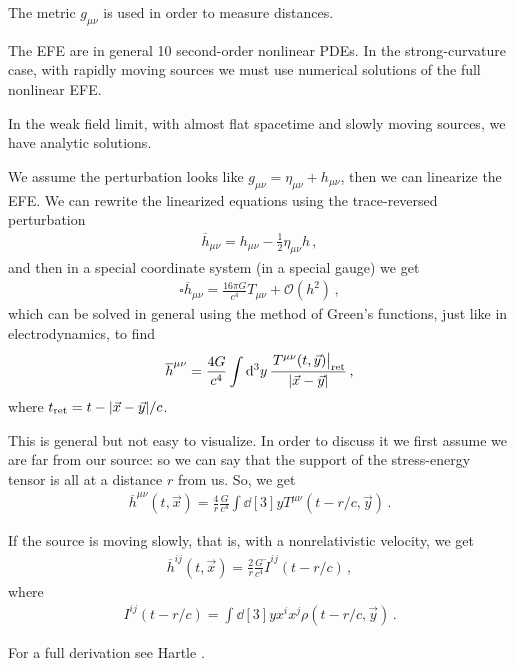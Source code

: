 \documentclass[main.tex]{subfiles}
\begin{document}
The metric \(g_{\mu \nu }\) is used in order to measure distances. 

The EFE are in general 10 second-order nonlinear PDEs. 
In the strong-curvature case, with rapidly moving sources we must use numerical solutions of the full nonlinear EFE. 

In the weak field limit, with almost flat spacetime and slowly moving sources, we have analytic solutions. 

We assume the perturbation looks like \(g_{\mu \nu } = \eta_{\mu \nu } + h_{\mu \nu } \), then we can linearize the EFE. We can rewrite the linearized equations using the trace-reversed perturbation 
%
\begin{align}
\overline{h}_{\mu \nu } = h_{\mu \nu } - \frac{1}{2} \eta_{\mu \nu } h
\,,
\end{align}
%
and then in a special coordinate system (in a special gauge) we get 
%
\begin{align}
\square \overline{h}_{\mu \nu } = \frac{16 \pi G}{c^{4}} T_{\mu \nu } + \mathcal{O}(h^2)
\,,
\end{align}
%
which can be solved in general using the method of Green's functions, just like in electrodynamics, to find 
%
\begin{align}
\overline{h}^{\mu \nu } = \frac{4G}{c^{4}} \int \dd[3]{y} \frac{\eval{T^{\mu \nu} (t, \vec{y})}_{\text{ret}}}{\abs{\vec{x}- \vec{y}}}
\,,
\end{align}
%
where \(t _{\text{ret}} = t - \abs{\vec{x} - \vec{y}}/c\). 

This is general but not easy to visualize. In order to discuss it we first assume we are far from our source:
so we can say that the support of the stress-energy tensor is all at a distance \(r\) from us. So, we get 
%
\begin{align}
\overline{h}^{\mu \nu } (t, \vec{x}) = \frac{4}{r} \frac{G}{c^{4}} \int \dd[3]{y} T^{\mu \nu } (t - r/c, \vec{y})
\,.
\end{align}

If the source is moving slowly, that is, with a nonrelativistic velocity, we get 
%
\begin{align}
\overline{h}^{ij} (t, \vec{x}) = \frac{2}{r} \frac{G}{c^{4}} \ddot{I}^{ij} (t- r/c)
\,,
\end{align}
%
where 
%
\begin{align}
I^{ij} (t- r/c) = \int \dd[3]{y} x^{i} x^{j} \rho (t- r/c, \vec{y})
\,.
\end{align}

For a full derivation see Hartle \cite[]{hartleGravityIntroductionEinstein2003}. 
\end{document}
